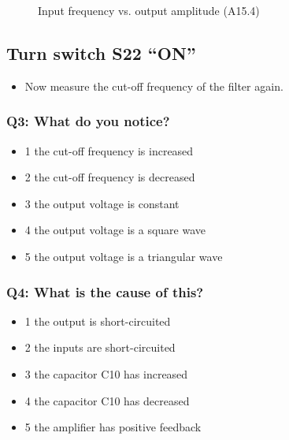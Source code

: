 \begin{figure}[H]
    \centering
    \caption{Input frequency vs. output amplitude (A15.4)}
    \label{fig:A15.4_graph}
\end{figure}

\subsection*{Turn switch S22 ``ON''}
\begin{itemize}
    \item Now measure the cut-off frequency of the filter again.
\end{itemize}

\subsubsection*{Q3: What do you notice?}
\begin{itemize}
    \item[\textendash] 1 the cut-off frequency is increased
    \item[\textendash] 2 the cut-off frequency is decreased
    \item[\textendash] 3 the output voltage is constant
    \item[\textendash] 4 the output voltage is a square wave
    \item[\textendash] 5 the output voltage is a triangular wave
\end{itemize}

\subsubsection*{Q4: What is the cause of this?}
\begin{itemize}
    \item[\textendash] 1 the output is short-circuited
    \item[\textendash] 2 the inputs are short-circuited
    \item[\textendash] 3 the capacitor C10 has increased
    \item[\textendash] 4 the capacitor C10 has decreased
    \item[\textendash] 5 the amplifier has positive feedback
\end{itemize}
